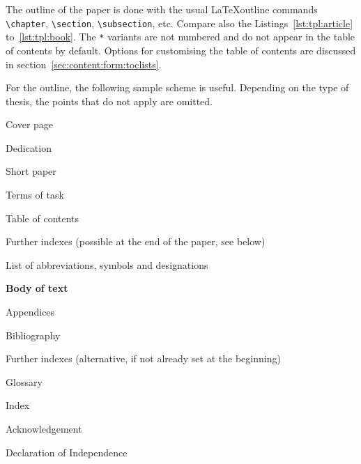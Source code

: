 The outline of the paper is done with the usual \LaTeX outline commands \verb+\chapter+,
\verb+\section+, \verb+\subsection+, etc. Compare also the Listings~\ref{lst:tpl:article}
to~\ref{lst:tpl:book}. The \texttt{*} variants are not numbered and do not appear in the
table of contents by default. Options for customising the table of contents
are discussed in section~\ref{sec:content:form:toclists}.

For the outline, the following sample scheme is useful. Depending on the type
of thesis, the points that do not apply are omitted.

\begin{compactitem}
\item Cover page
\item Dedication
\item Short paper
\item Terms of task
\item Table of contents
\item Further indexes
      (possible at the end of the paper, see below)
\item List of abbreviations, symbols and designations
\item \textbf{Body of text}
\item Appendices
\item Bibliography
\item Further indexes
      (alternative, if not already set at the beginning)
\item Glossary
\item Index
\item Acknowledgement
\item Declaration of Independence
\end{compactitem}
